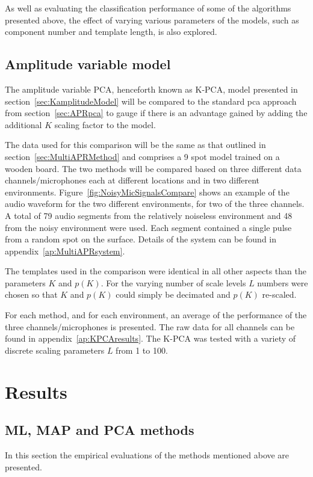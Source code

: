 As well as evaluating the classification performance of some of the algorithms presented above, the effect of varying various parameters of the models, such as component number and template length, is also explored.

\subsection{Amplitude variable model}
The amplitude variable PCA, henceforth known as K-PCA, model presented in section~\ref{sec:KamplitudeModel} will be compared to the standard \gls{pca}  approach from section~\ref{sec:APRpca} to gauge if there is an advantage gained by adding the additional $K$ scaling factor to the model.

The data used for this comparison will be the same as that outlined in section~\ref{sec:MultiAPRMethod} and comprises a 9 spot model trained on a wooden board. The two methods will be compared based on three different data channels/microphones each at different locations and in two different environments. Figure~\ref{fig:NoisyMicSignalsCompare} shows an example of the audio waveform for the two different environments, for two of the three channels. A total of 79 audio segments from the relatively noiseless environment and 48 from the noisy environment were used. Each segment contained a single pulse from a random spot on the surface. Details of the system can be found in appendix~\ref{ap:MultiAPRsystem}.

The templates used in the comparison were identical in all other aspects than the parameters $K$ and $p(K)$. For the varying number of scale levels $L$ numbers were chosen so that $K$ and $p(K)$ could simply be decimated and $p(K)$ re-scaled.

For each method, and for each environment, an average of the performance of the three channels/microphones is presented. The raw data for all channels can be found in appendix~\ref{ap:KPCAresults}. The K-PCA was tested with a variety of discrete scaling parameters $L$ from 1 to 100.

\section{Results}\label{sec:results}
\subsection{ML, MAP and PCA methods}
In this section the empirical evaluations of the methods mentioned above are presented.

